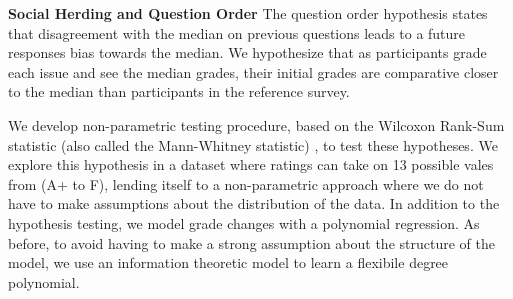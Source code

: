 \noindent \textbf{Social Herding and Question Order} The question order hypothesis states that disagreement with the median on previous questions leads to a future responses bias towards the median. We hypothesize that as participants grade each issue and see the median grades, their initial grades are comparative closer to the median than participants in the reference survey.

We develop non-parametric testing procedure, based on the Wilcoxon Rank-Sum statistic (also called the Mann-Whitney statistic) \cite{lehmann2006nonparametrics}, to test these hypotheses.
We explore this hypothesis in a dataset where ratings can take on 13 possible vales from (A+ to F), lending itself to a non-parametric approach where we do not have to make assumptions about the distribution of the data.
In addition to the hypothesis testing, we model grade changes with a polynomial regression.
As before, to avoid having to make a strong assumption about the structure of the model, we use an information theoretic model to learn a flexibile degree polynomial.


